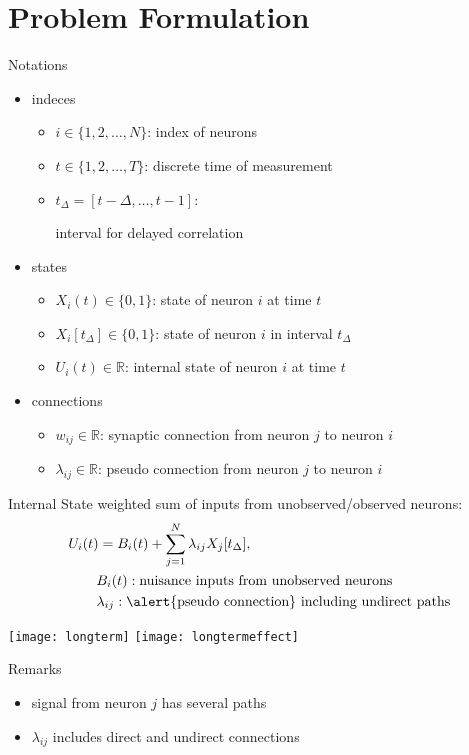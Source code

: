 \documentclass[fleqn,aspectratio=1610]{beamer}
\begin{document}
\section{Problem Formulation}
\label{sec:orgcc485eb}
\begin{frame}[label={sec:org6d354a2}]{Notations}
\begin{itemize}
\item indeces
\begin{itemize}
\item \(i\in\{1,2,\dotsc,N\}\):
index of neurons
\item \(t\in\{1,2,\dotsc,T\}\):
discrete time of measurement
\item \(t_{\Delta}=[t-\Delta,\dotsc,t-1]\):

interval for delayed correlation
\end{itemize}
\item states
\begin{itemize}
\item \(X_{i}(t)\in\{0,1\}\):
state of neuron \(i\) at time \(t\)
\item \(X_{i}[t_{\Delta}]\in\{0,1\}\):
state of neuron \(i\) in interval \(t_{\Delta}\)
\item \(U_{i}(t)\in\mathbb{R}\):
internal state of neuron \(i\) at time \(t\)
\end{itemize}
\item connections
\begin{itemize}
\item \(w_{ij}\in\mathbb{R}\):
synaptic connection from neuron \(j\) to neuron \(i\)
\item \(\lambda_{ij}\in\mathbb{R}\):
pseudo connection from neuron \(j\) to neuron \(i\)
\end{itemize}
\end{itemize}
\end{frame}
\begin{frame}[label={sec:org82957d8}]{Internal State}
weighted sum of inputs from unobserved/observed neurons:
\begin{align}
  &U_i(t)
    = B_i(t) + \sum_{j=1}^{N} \lambda_{ij} X_j[t_\Delta],\\
  &\qquad B_{i}(t): \text{nuisance inputs from unobserved neurons}\\
  &\qquad \lambda_{ij}: \text{\alert{pseudo connection} including
    undirect paths}
\end{align}
\begin{center}
\texttt{[image: longterm]}
\hspace*{.05\linewidth}
\texttt{[image: longtermeffect]}
\end{center}
\begin{alertblock}{Remarks}
\begin{itemize}
\item signal from neuron \(j\) has several paths
\item \(\lambda_{ij}\) includes direct and undirect connections
\end{itemize}
\end{alertblock}
\end{frame}
\end{document}

